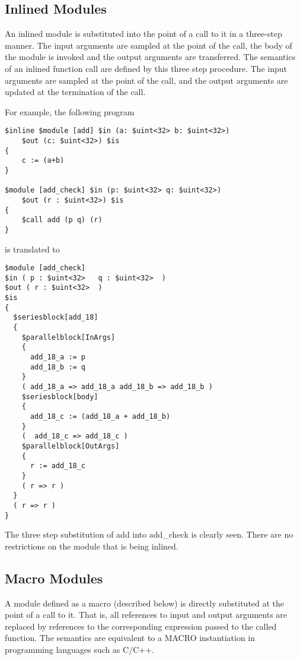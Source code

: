 \documentclass{article}
\begin{document}
\subsection{Inlined Modules}

An inlined module is substituted into the
point of a call to it in a three-step manner.
The input arguments are sampled at the point
of the call, the body of
the module is invoked and the output arguments
are transferred.  The semantics of an inlined
function call are defined by this three step
procedure.  The input arguments are sampled
at the point of the call, and the output
arguments are updated at the termination of
the call.

For example, the following
program 
\begin{verbatim}
$inline $module [add] $in (a: $uint<32> b: $uint<32>)
    $out (c: $uint<32>) $is
{
    c := (a+b)
}  

$module [add_check] $in (p: $uint<32> q: $uint<32>) 
    $out (r : $uint<32>) $is
{
    $call add (p q) (r)
}
\end{verbatim}
is translated to
\begin{verbatim}
$module [add_check]
$in ( p : $uint<32>   q : $uint<32>  )
$out ( r : $uint<32>  )
$is
{
  $seriesblock[add_18] 
  {
    $parallelblock[InArgs] 
    {
      add_18_a := p
      add_18_b := q
    }
    ( add_18_a => add_18_a add_18_b => add_18_b )
    $seriesblock[body] 
    {
      add_18_c := (add_18_a + add_18_b)
    }
    (  add_18_c => add_18_c )
    $parallelblock[OutArgs] 
    {
      r := add_18_c
    }
    ( r => r )
  }
  ( r => r )
}
\end{verbatim}
The three step substitution of add into add\_check
is clearly seen.  
There are no restrictions on the
module that is being inlined.


\subsection{Macro Modules}

A module defined as a macro (described below)
is directly substituted at the point of a call
to it.  That is, all references to input and
output arguments
are replaced by references to the corresponding
expression passed to the called function.  
The semantics are equivalent to a MACRO instantiation
in programming languages such as C/C++.
\end{document}
